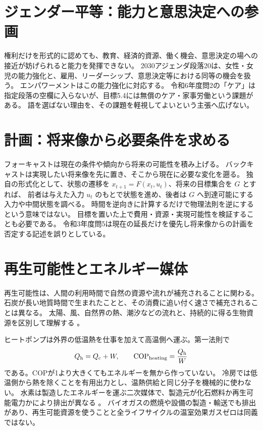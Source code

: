 \section{ジェンダー平等：能力と意思決定への参画}
\label{theory:environment:gender}
権利だけを形式的に認めても、教育、経済的資源、働く機会、意思決定の場への接近が妨げられると能力を発揮できない。
2030アジェンダ段落20は、女性・女児の能力強化と、雇用、リーダーシップ、意思決定等における同等の機会を扱う。
エンパワーメントはこの能力強化に対応する\cite{env_sdgs_agenda}。
令和6年度問2の「ケア」は指定段落の空欄に入らないが、目標5.4には無償のケア・家事労働という課題がある。
語を選ばない理由を、その課題を軽視してよいという主張へ広げない。

\section{計画：将来像から必要条件を求める}
\label{theory:environment:planning}
フォーキャストは現在の条件や傾向から将来の可能性を積み上げる。
バックキャストは実現したい将来像を先に置き、そこから現在に必要な変化を遡る。
独自の形式化として、状態の遷移を \(x_{t+1}=F(x_t,u_t)\)、将来の目標集合を \(G\) とすれば、
前者は与えた入力 \(u_t\) のもとで状態を進め、後者は \(G\) へ到達可能にする入力や中間状態を調べる。
時間を逆向きに計算するだけで物理法則を逆にするという意味ではない。
目標を置いた上で費用・資源・実現可能性を検証することも必要である。
令和3年度問5は現在の延長だけを優先し将来像からの計画を否定する記述を誤りとしている。

\section{再生可能性とエネルギー媒体}
\label{theory:environment:energy}
再生可能性は、人間の利用時間で自然の資源や流れが補充されることに関わる。
石炭が長い地質時間で生まれたことと、その消費に追い付く速さで補充されることは異なる。
太陽、風、自然界の熱、潮汐などの流れと、持続的に得る生物資源を区別して理解する
\cite{env_renewable2022,env_biomass}。

ヒートポンプは外界の低温熱を仕事を加えて高温側へ運ぶ。第一法則で
\[
 Q_{\rm h}=Q_{\rm c}+W,\qquad {\rm COP}_{\rm heating}=\frac{Q_{\rm h}}{W}
\]
である。COPが1より大きくてもエネルギーを無から作っていない。
冷房では低温側から熱を除くことを有用出力とし、温熱供給と同じ分子を機械的に使わない。
水素は製造したエネルギーを運ぶ二次媒体で、製造元が化石燃料か再生可能電力かにより排出が異なる
\cite{env_hydrogen2015}。
バイオガスの燃焼や設備の製造・輸送でも排出があり、再生可能資源を使うことと全ライフサイクルの温室効果ガスゼロは同義ではない。


